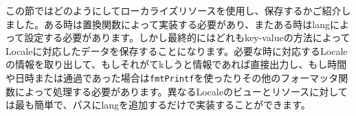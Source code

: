 この節ではどのようにしてローカライズリソースを使用し、保存するかご紹介しました。ある時は置換関数によって実装する必要があり、またある時はlangによって設定する必要があります。しかし最終的にはどれもkey-valueの方法によってLocaleに対応したデータを保存することになります。必要な時に対応するLocaleの情報を取り出して、もしそれがてkしうと情報であれば直接出力し、もし時間や日時または通過であった場合は\texttt{fmtPrintf}を使ったりその他のフォーマッタ関数によって処理する必要があります。異なるLocaleのビューとリソースに対しては最も簡単で、パスにlangを追加するだけで実装することができます。
